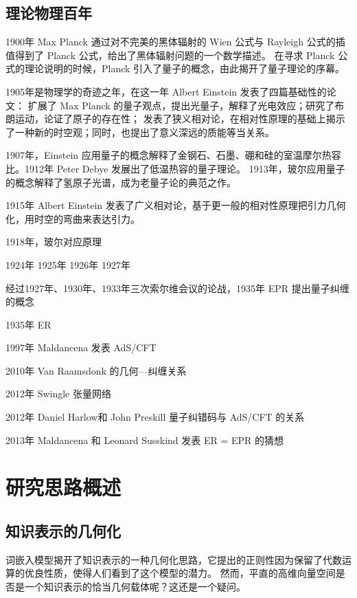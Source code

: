 \documentclass[a4paper,12pt]{article}
\begin{document}
\subsection{理论物理百年}

1900年 Max Planck 通过对不完美的黑体辐射的 Wien 公式与 Rayleigh 公式的插值得到了 Planck 公式，给出了黑体辐射问题的一个数学描述。
在寻求 Planck 公式的理论说明的时候，Planck 引入了量子的概念，由此揭开了量子理论的序幕。

1905年是物理学的奇迹之年，在这一年 Albert Einstein 发表了四篇基础性的论文：
扩展了 Max Planck 的量子观点，提出光量子，解释了光电效应；研究了布朗运动，论证了原子的存在性；
发表了狭义相对论，在相对性原理的基础上揭示了一种新的时空观；同时，也提出了意义深远的质能等当关系。

1907年，Einstein 应用量子的概念解释了金钢石、石墨、硼和硅的室温摩尔热容比。1912年 Peter Debye 发展出了低温热容的量子理论。
1913年，玻尔应用量子的概念解释了氢原子光谱，成为老量子论的典范之作。

1915年 Albert Einstein 发表了广义相对论，基于更一般的相对性原理把引力几何化，用时空的弯曲来表达引力。

1918年，玻尔对应原理

1924年
1925年
1926年
1927年

经过1927年、1930年、1933年三次索尔维会议的论战，1935年 EPR 提出量子纠缠的概念

1935年 ER

1997年 Maldancena 发表 AdS/CFT

2010年 Van Raamsdonk 的几何—纠缠关系

2012年 Swingle 张量网络

2012年 Daniel Harlow和 John Preskill 量子纠错码与 AdS/CFT 的关系

2013年 Maldancena 和 Leonard Susskind 发表 ER = EPR 的猜想

\newpage

\section{研究思路概述}

\subsection{知识表示的几何化}

词嵌入模型揭开了知识表示的一种几何化思路，它提出的正则性因为保留了代数运算的优良性质，使得人们看到了这个模型的潜力。
然而，平直的高维向量空间是否是一个知识表示的恰当几何载体呢？这还是一个疑问。
\end{document}
